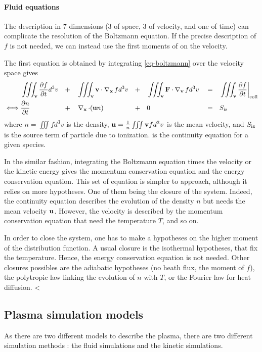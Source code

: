 \paragraph{Fluid equations \\}
The description in 7 dimensions (3 of space, 3 of velocity, and one of time) can complicate the resolution of the Boltzmann equation.
If the precise description of $f$ is not needed, we can instead use the first moments of  on the velocity.

The first equation is obtained by integrating \cref{eq-boltzmann} over the velocity space gives
\begin{align}
    & \iiint_{{\mathbf v}}  \frac{\partial f}{\partial t} d^3v &&+&& \iiint_{{\mathbf v}}  {\mathbf v} \cdot \operatorname{{\mathbf \nabla}}_{{\mathbf x}} f  d^3v &&+&&  \iiint_{{\mathbf v}}  {\mathbf F} \cdot  \operatorname{{\mathbf \nabla}}_{{\mathbf v}} f  d^3v && = && \iiint_{{\mathbf v}}  \frac{\partial f}{\partial t}  \bigg\vert_{\rm coll}  \nonumber  \\ 
   \iff &  \frac{\partial n}{\partial t} &&+&&  \operatorname{{\mathbf \nabla}}_{{\mathbf x}}  \cdot  ( {\mathbf u} n) &&+&& 0 &&=&& S_{\rm iz}   \label{eq-conc}
\end{align} 
where $n=\iiint f d^3v$ is the density, ${\mathbf u} = \frac{1}{n} \iiint {\mathbf v} f d^3v$ is the mean velocity, and $S_{\rm iz}$ is the source term of particle due to ionization.
 is the continuity equation for a given species.

In the similar fashion, integrating the Boltzmann equation times the velocity or the kinetic energy gives the momentum conservation equation and the energy conservation equation.
This set of equation is simpler to approach, although it relies on more hypotheses.
One of them being the closure of the system.
Indeed, the continuity equation describes the evolution of the density $n$ but needs the mean velocity ${\mathbf u}$.
However, the velocity is described by the momentum conservation equation that need the temperature $T$, and so on.

In order to close the system, one has to make a hypotheses on the higher moment of the distribution function.
A usual closure is the isothermal hypotheses, that fix the temperature. 
Hence, the energy conservation equation is not needed.
Other closures possibles are the adiabatic hypotheses (no heath flux, the  moment of $f$), the polytropic law linking the evolution of $n$ with $T$, or the Fourier law for heat diffusion.
<


\subsection*{Plasma simulation models} \label{subsec-simulations}
As there are two different models to describe the plasma, there are two different simulation methods \string: the fluid simulations and the kinetic simulations.

